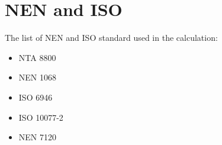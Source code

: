 \section{NEN and ISO}

The list of NEN and ISO standard used in the calculation:

\begin{itemize}
    \item NTA 8800
    \item NEN 1068
    \item ISO 6946
    \item ISO 10077-2
    \item NEN 7120
\end{itemize}

\newpage
